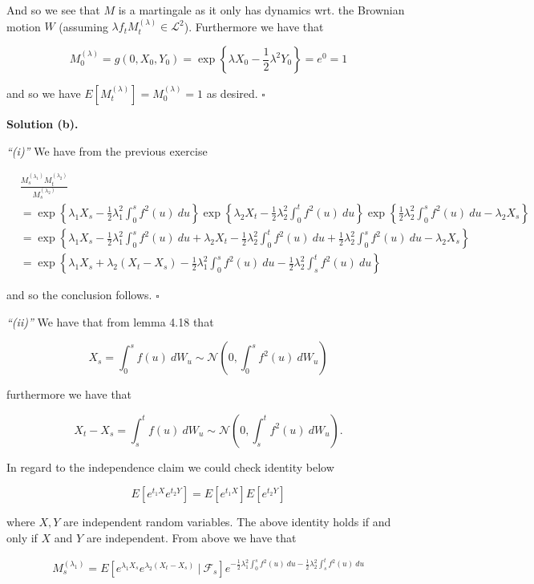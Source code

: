 \documentclass[
]{book}
\begin{document}
And so we see that \(M\) is a martingale as it only has dynamics wrt. the Brownian motion \(W\) (assuming \(\lambda f_tM_t^{(\lambda)}\in\mathcal{L}^2\)). Furthermore we have that

\[
M_0^{(\lambda)}=g(0,X_0,Y_0)=\exp\left\{\lambda X_0-\frac{1}{2}\lambda ^2 Y_0\right\}=e^0=1
\]

and so we have \(E[M_t^{(\lambda)}]=M_0^{(\lambda)}=1\) as desired. \(\square\)

\textbf{Solution (b).}

\emph{``(i)''} We have from the previous exercise

\begin{align*}
&\frac{M^{(\lambda_1)}_sM^{(\lambda_2)}_t}{M^{(\lambda_2)}_s}\\
&=\exp\left\{\lambda_1 X_s-\frac{1}{2}\lambda_1^2\int_0^s f^2(u)\ du\right\}\exp\left\{\lambda_2 X_t-\frac{1}{2}\lambda_2^2\int_0^t f^2(u)\ du\right\}\exp\left\{\frac{1}{2}\lambda_2^2\int_0^s f^2(u)\ du-\lambda_2 X_s\right\}\\
&=\exp\left\{\lambda_1 X_s-\frac{1}{2}\lambda_1^2\int_0^s f^2(u)\ du+\lambda_2 X_t-\frac{1}{2}\lambda_2^2\int_0^t f^2(u)\ du+\frac{1}{2}\lambda_2^2\int_0^s f^2(u)\ du-\lambda_2 X_s\right\}\\
&=\exp\left\{\lambda_1 X_s+\lambda_2 (X_t-X_s)-\frac{1}{2}\lambda_1^2\int_0^s f^2(u)\ du-\frac{1}{2}\lambda_2^2\int_s^t f^2(u)\ du\right\}
\end{align*}

and so the conclusion follows. \(\square\)

\emph{``(ii)''} We have that from lemma 4.18 that

\[
X_s=\int_0^sf(u)\ dW_u\sim \mathcal{N}\left(0,\int_0^sf^2(u)\ dW_u\right)
\]

furthermore we have that

\[
X_t-X_s=\int_s^tf(u)\ dW_u\sim \mathcal{N}\left(0,\int_s^tf^2(u)\ dW_u\right).
\]

In regard to the independence claim we could check identity below

\[
E[e^{t_1X}e^{t_2 Y}]=E[e^{t_1X}]E[e^{t_2Y}]
\]

where \(X,Y\) are independent random variables. The above identity holds if and only if \(X\) and \(Y\) are independent. From above we have that

\[
M_s^{(\lambda_1)}=E[e^{\lambda_1X_s}e^{\lambda_2(X_t-X_s)}\ \vert\ \mathcal{F}_s]e^{-\frac{1}{2}\lambda_1^2\int_0^s f^2(u)\ du-\frac{1}{2}\lambda_2^2\int_s^t f^2(u)\ du}
\]
\end{document}
